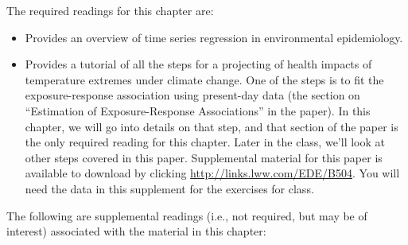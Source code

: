 \documentclass[
]{book}
\providecommand{\tightlist}{%
  \setlength{\itemsep}{0pt}\setlength{\parskip}{0pt}}
\begin{document}
The required readings for this chapter are:

\begin{itemize}
\tightlist
\item
  \citet{bhaskaran2013time} Provides an overview of time series regression
  in environmental epidemiology.
\item
  \citet{vicedo2019hands} Provides a tutorial of all the steps for a
  projecting of health impacts of temperature extremes under climate change.
  One of the steps is to fit the exposure-response association using present-day data
  (the section on ``Estimation of Exposure-Response Associations'' in the paper).
  In this chapter, we will go into details on that step, and that section of the paper
  is the only required reading for this chapter. Later in the class, we'll
  look at other steps covered in this paper. Supplemental material for this paper is
  available to download by
  clicking \url{http://links.lww.com/EDE/B504}. You will need the data in this supplement
  for the exercises for class.
\end{itemize}

The following are supplemental readings (i.e., not required, but may be of
interest) associated with the material in this chapter:
\end{document}
